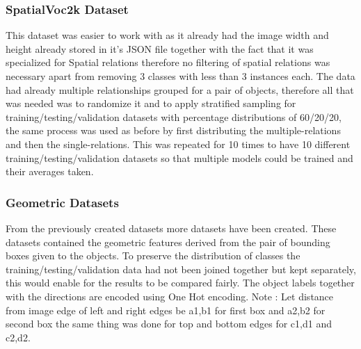 \documentclass{csfyp}
\begin{document}
\subsubsection{SpatialVoc2k Dataset}
This dataset was easier to work with as it already had the image width and height already stored in it’s JSON file together with the fact that it was specialized for Spatial relations therefore no filtering of spatial relations was necessary apart from removing 3 classes with less than 3 instances each. The data had already multiple relationships grouped for a pair of objects, therefore all that was needed was to randomize it and to apply stratified sampling for training/testing/validation datasets with percentage distributions of 60/20/20, the same process was used as before by first distributing the multiple-relations and then the single-relations. This was repeated for 10 times to have 10 different training/testing/validation datasets so that multiple models could be trained and their averages taken.

\subsubsection{Geometric Datasets}
From the previously created datasets more datasets have been created. These datasets contained the geometric features derived from the pair of bounding boxes given to the objects. To preserve the distribution of classes the training/testing/validation data had not been joined together but kept separately, this would enable for the results to be compared fairly. The object labels together with the directions are encoded using One Hot encoding.
Note : Let distance from image edge of left and right edges be a1,b1 for first box and a2,b2 for second box the same thing was done for top and bottom edges for c1,d1 and c2,d2.
\end{document}
